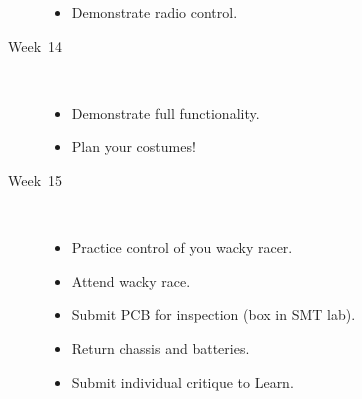 \begin{description}
  \begin{itemize}
  \item Demonstrate radio control.
  \end{itemize}

\item [Week~14]\mbox{}\\

  \begin{itemize}
  \item Demonstrate full functionality.
  \item Plan your costumes!
  \end{itemize}

\item [Week~15]\mbox{}\\

  \begin{itemize}
  \item Practice control of you wacky racer.
  \item Attend wacky race.
  \item Submit PCB for inspection (box in SMT lab).
  \item Return chassis and batteries.
  \item Submit individual critique to Learn.
  \end{itemize}

\end{description}
